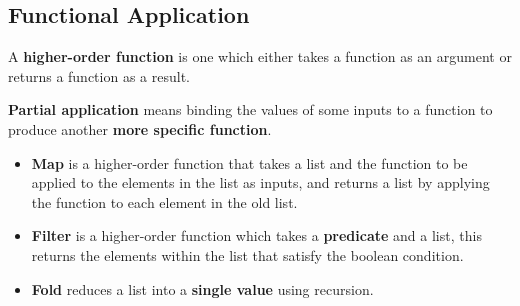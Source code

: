 \subsection{Functional Application}

A \textbf{higher-order function} is one which either takes a function as an argument or returns a function as a result.

\textbf{Partial application} means binding the values of some inputs to a function to produce another \textbf{more specific function}.

\begin{itemize}
    \item \textbf{Map} is a higher-order function that takes a list and the function to be applied to the elements in the list as inputs, and returns a list by applying the function to each element in the old list.
    \item \textbf{Filter} is a higher-order function which takes a \textbf{predicate} and a list, this returns the elements within the list that satisfy the boolean condition.
    \item \textbf{Fold} reduces a list into a \textbf{single value} using recursion.
\end{itemize}

